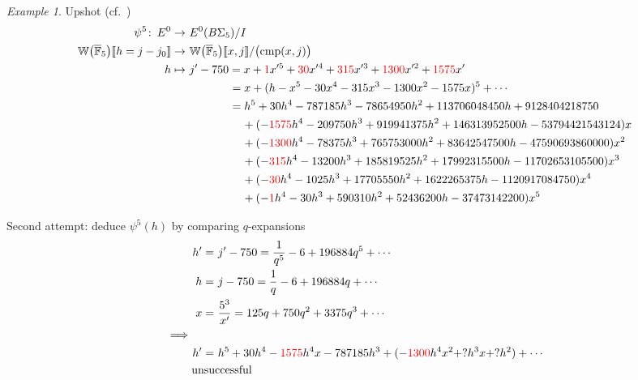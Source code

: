 \documentclass{rs}
\theoremstyle{definition}
\theoremstyle{remark}
\newtheorem{ex}[equation]{Example}
\def\co{\colon\thinspace}
\newcommand{\mb}[1]{\mathbb{#1}}
\newcommand{\cF}{\overline {\mb F}}
\newcommand{\cmp}{{\rm cmp}}
\newcommand{\BW}{{\mb W}}
\newcommand{\lb}{\llbracket}
\newcommand{\rb}{\rrbracket}
\renewcommand{\=}{\approx}
\renewcommand{\-}{\sim}
\newcommand{\rd}[1]{{\textcolor{red}{#1}}}
\numberwithin{equation}{section}
\begin{document}
\begin{ex}
 Upshot (cf.~\cite[(3.10)]{ho}) 
 \[
  \begin{split}
                          \psi^5 \co E^0 \to & ~ E^0(B\Sigma_5) / I \\
   \BW\big(\cF_5\big)\lb h = j - j_0 \rb \to & ~ \BW\big(\cF_5\big)\lb x,j \rb / \big(\cmp(x,j)\big) \\
                                   h \mapsto & ~    j' - 750 = x + \rd{1} x'^5 + \rd{30} x'^4 + \rd{315} x'^3 + \rd{1300} x'^2 + \rd{1575} x' \\
                                             & \hskip 1.35cm = x + (h - x^5 - 30 x^4 - 315 x^3 - 1300 x^2 - 1575 x)^5 + \cdots \\
                                             & \hskip 1.35cm = h^5 + 30 h^4 - 787185 h^3 - 78654950 h^2 + 113706048450 h + 9128404218750 \\
                                             & \hskip 1.75cm   + (-\rd{1575} h^4 - 209750 h^3 + 919941375 h^2 + 146313952500 h - 53794421543124) x \\
                                             & \hskip 1.75cm   + (-\rd{1300} h^4 - 78375 h^3 + 765753000 h^2 + 83642547500 h - 47590693860000) x^2 \\
                                             & \hskip 1.75cm   + (-\rd{315} h^4 - 13200 h^3 + 185819525 h^2 + 17992315500 h - 11702653105500) x^3 \\
                                             & \hskip 1.75cm   + (-\rd{30} h^4 - 1025 h^3 + 17705550 h^2 + 1622265375 h - 1120917084750) x^4 \\
                                             & \hskip 1.75cm   + (-\rd{1} h^4 - 30 h^3 + 590310 h^2 + 52436200 h - 37473142200) x^5 
  \end{split}
 \]

 Second attempt: deduce $\psi^5(h)$ by comparing $q$-expansions 
 \[
  \begin{split}
   h' = & ~ j' - 750 = \frac{1}{q^5} - 6 + 196884 q^5 + \cdots \\
    h = & ~ j - 750 = \frac{1}{q} - 6 + 196884 q + \cdots \\
    x = & ~ \frac{5^3}{x'} = 125 q + 750 q^2 + 3375 q^3 + \cdots \\
   \implies \qquad & \\
   h' = & ~ h^5 + 30 h^4 - \rd{1575} h^4 x - 787185 h^3 + (-\rd{1300} h^4 x^2 + ? h^3 x + ? h^2) + \cdots \\
   & \hskip -.7cm \text{unsuccessful} 
  \end{split}
 \]


\end{ex}
\end{document}
